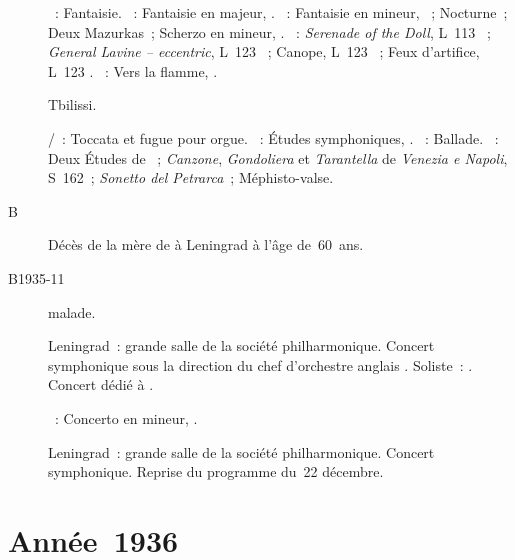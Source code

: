 \begin{description}
 \textsc{\Mozart{}}~: Fantaisie.
 \textsc{\Schumann{}}~: Fantaisie en \kC majeur, .
 \textsc{\Chopin{}}~: Fantaisie en \kF mineur, ~; Nocturne~; Deux
 Mazurkas~; Scherzo en \kB mineur, .
 \textsc{\Debussy{}}~: \emph{Serenade of the Doll}, L~113 ~;
 \emph{General Lavine -- eccentric}, L~123 ~; Canope, L~123
 ~; Feux d'artifice, L~123 .
 \textsc{\Scriabine{}}~: Vers la flamme, .
 \item[\DateWithWeekDay{1935-10-30}]
 Tbilissi.

 \textsc{\JBach{}/\Busoni{}}~: Toccata et fugue pour orgue.
 \textsc{\Schumann{}}~: Études symphoniques, .
 \textsc{\Chopin{}}~: Ballade.
 \textsc{\Liszt{}}~: Deux Études de \Paganini{}~; \emph{Canzone},
 \emph{Gondoliera} et \emph{Tarantella} de \emph{Venezia e Napoli}, S~162~;
 \emph{Sonetto del Petrarca}~; Méphisto-valse.
 \item[B\DateWithWeekDay{1935-10-31}]
 Décès de la mère de \VSofronitsky{} à Leningrad à l'âge de~60~ans.
 \item[B1935-11]
 \VSofronitsky{} malade.
 \item[\DateWithWeekDay{1935-12-22}]
 Leningrad~: grande salle de la société philharmonique.
 Concert symphonique sous la direction du chef d'orchestre anglais
 \ACoates{}.
 Soliste~: \VSofronitsky{}.
 Concert dédié à \ESofronitskaya{}.

 \textsc{\Scriabine{}}~: Concerto en \kF \Sharp mineur, .
 \item[\DateWithWeekDay{1935-12-24}]
 Leningrad~: grande salle de la société philharmonique.
 Concert symphonique.
 Reprise du programme du~22 décembre.
\end{description}

\section{Année~1936}


